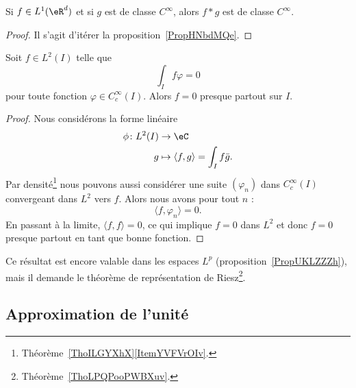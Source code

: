 \begin{corollary}       \label{CORooBSPNooFwYQrc}
    Si \( f\in L^1(\eR^d)\) et si \( g\) est de classe \(  C^{\infty}\), alors \( f*g\) est de classe \(  C^{\infty}\).
\end{corollary}

\begin{proof}
    Il s'agit d'itérer la proposition~\ref{PropHNbdMQe}.
\end{proof}

\begin{lemma}       \label{LemDQEKNNf}
    Soit \( f\in L^2(I)\) telle que
    \begin{equation}
        \int_If\varphi=0
    \end{equation}
    pour toute fonction \( \varphi\in C^{\infty}_c(I)\). Alors \( f=0\) presque partout sur \( I\).
\end{lemma}

\begin{proof}
    Nous considérons la forme linéaire
    \begin{equation}
        \begin{aligned}
            \phi\colon L^2(I)&\to \eC \\
            g&\mapsto \langle f, g\rangle=\int_If\bar g .
        \end{aligned}
    \end{equation}
    Par densité\footnote{Théorème~\ref{ThoILGYXhX}\ref{ItemYVFVrOIv}.} nous pouvons aussi considérer une suite \( (\varphi_n)\) dans \(  C^{\infty}_c(I)\) convergeant dans \( L^2\) vers \( f\). Alors nous avons pour tout \( n\) :
    \begin{equation}
        \langle f, \varphi_n\rangle =0.
    \end{equation}
    En passant à la limite, \( \langle f, f\rangle =0\), ce qui implique \( f=0\) dans \( L^2\) et donc \( f=0\) presque partout en tant que bonne fonction.
\end{proof}
Ce résultat est encore valable dans les espaces \( L^p\) (proposition~\ref{PropUKLZZZh}), mais il demande le théorème de représentation de Riesz\footnote{Théorème~\ref{ThoLPQPooPWBXuv}.}.

\subsection{Approximation de l'unité}


